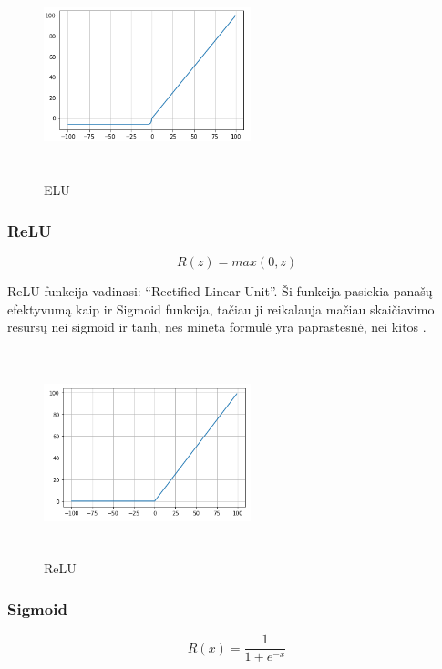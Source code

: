 \documentclass{VUMIFInfKursinis}
\begin{document}
\begin{figure}[ht]
  \centering
  \includegraphics[width=6cm,height=6cm,keepaspectratio]{elu.png}
  \caption{ELU}
  \label{fig:elu}
\end{figure}

\subsubsection{ReLU}
\begin{equation}
  R(z) = max(0, z)
\end{equation}

\par
ReLU funkcija vadinasi: \enquote{Rectified Linear Unit}. Ši funkcija pasiekia panašų efektyvumą
kaip ir Sigmoid funkcija, tačiau ji reikalauja mačiau skaičiavimo resursų nei sigmoid
ir tanh, nes minėta formulė yra paprastesnė, nei kitos \cite{salt16}.

\begin{figure}[ht]
  \centering
  \includegraphics[width=6cm,height=6cm,keepaspectratio]{relu.png}
  \caption{ReLU}
  \label{fig:relu}
\end{figure}

\subsubsection{Sigmoid}
\begin{equation}
  R(x) = \frac{1}{1 + e^{-x}}
\end{equation}
\end{document}
